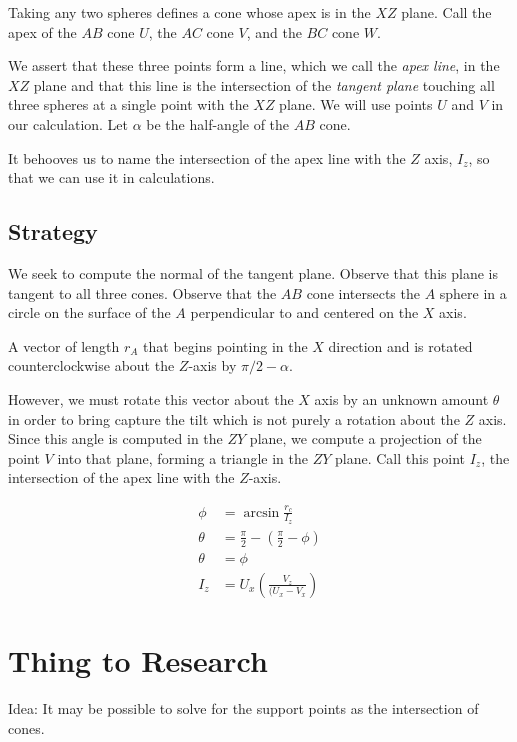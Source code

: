 \documentclass{article}
\begin{document}
Taking any two spheres defines a cone whose apex is in the $XZ$ plane.
Call the apex of the $AB$ cone $U$, the $AC$ cone $V$, and the $BC$ cone $W$.

We assert that these three points form a line, which we call the {\em apex line}, in the $XZ$ plane and that this
line is the intersection of the {\em tangent plane} touching all three spheres at a single point
with the $XZ$ plane. We will use points $U$ and $V$ in our calculation.
Let $\alpha$ be the half-angle of the $AB$ cone.

It behooves us to name the intersection of the apex line with the $Z$ axis, $I_z$, so
that we can use it in calculations.

\subsection{Strategy}

We seek to compute the normal of the tangent plane.
Observe that this plane is tangent to all three cones.
Observe that the $AB$ cone intersects
the $A$ sphere in a circle on the surface of the $A$ perpendicular to and centered on the $X$ axis.

A vector of length $r_A$ that begins pointing in the $X$ direction and is rotated counterclockwise
about the $Z$-axis by $\pi/2 - \alpha$.

However, we must rotate this vector about the $X$ axis by an unknown amount $\theta$ in order
to bring capture the tilt which is not purely a rotation about the $Z$ axis.
Since this angle is computed in the $ZY$ plane, we compute a projection of the point $V$ into
that plane, forming a triangle in the $ZY$ plane.  Call this point $I_z$, the intersection
of the apex line with the $Z$-axis.

\begin{align}
 \phi &= \arcsin{\frac{r_c}{I_z}}\\
\theta &= \frac{\pi}{2} - (\frac{\pi}{2} - \phi)\\
\theta &= \phi\\
I_z &= U_x(\frac{V_z}{(U_x - V_x})
\end{align}



\section{Thing to Research}

Idea: It may be possible to solve for the support points as the intersection of cones\cite{shene1994lower}.




\end{document}
